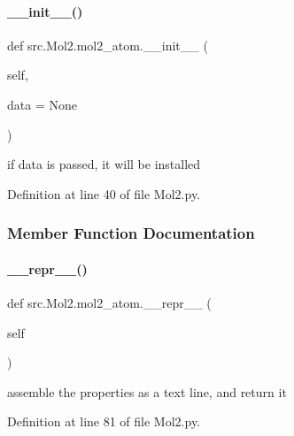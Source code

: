 \paragraph{\texorpdfstring{\+\_\+\+\_\+init\+\_\+\+\_\+()}{\_\_init\_\_()}}
{\footnotesize\ttfamily def src.\+Mol2.\+mol2\+\_\+atom.\+\_\+\+\_\+init\+\_\+\+\_\+ (\begin{DoxyParamCaption}\item[{}]{self,  }\item[{}]{data = {\ttfamily None} }\end{DoxyParamCaption})}



if data is passed, it will be installed 



Definition at line 40 of file Mol2.\+py.



\subsubsection{Member Function Documentation}
\mbox{\label{classsrc_1_1Mol2_1_1mol2__atom_af9d41c384b057ff1f813baa4dfb9360d}} 
\paragraph{\texorpdfstring{\+\_\+\+\_\+repr\+\_\+\+\_\+()}{\_\_repr\_\_()}}
{\footnotesize\ttfamily def src.\+Mol2.\+mol2\+\_\+atom.\+\_\+\+\_\+repr\+\_\+\+\_\+ (\begin{DoxyParamCaption}\item[{}]{self }\end{DoxyParamCaption})}



assemble the properties as a text line, and return it 



Definition at line 81 of file Mol2.\+py.

\mbox{\label{classsrc_1_1Mol2_1_1mol2__atom_ae32d7dfab8bcae5050d7129037dbc94c}} 
